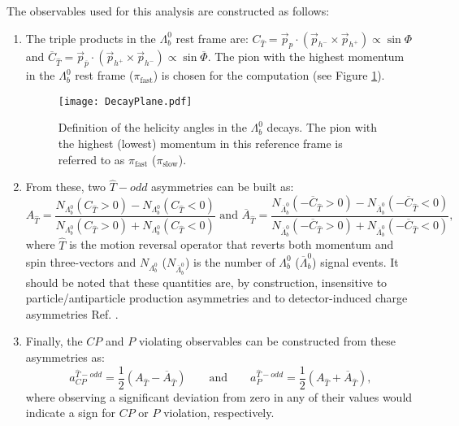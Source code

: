 \documentclass[12pt]{article}
\def\Pb      {\ensuremath{b}\xspace}
\def\PLambda      {\ensuremath{\Lambda}\xspace}
\def\Lz          {{\ensuremath{\PLambda}}\xspace}
\def\bquark    {{\ensuremath{\Pb}}\xspace}
\def\Lb      {{\ensuremath{\Lz^0_\bquark}}\xspace}
\def\CP                {{\ensuremath{C\!P}}\xspace}
\def\P                 {{\ensuremath{\!P}}\xspace}
\begin{document}
The observables used for this analysis are constructed as follows:
\begin{enumerate}
\item The triple products in the \Lb rest frame are: $C_{\hat{T}} = \vec{p}_p \cdot (\vec{p}_{h^-} \times \vec{p}_{h^+})\propto \sin \Phi$ and $\overline{C}_{\hat{T}} = \vec{p}_{\overline{p}} \cdot (\vec{p}_{h^+} \times \vec{p}_{h^-})\propto \sin \overline{\Phi}$. The pion with the highest momentum in the \Lb rest frame ($\pi_{\text{fast}}$) is chosen for the computation (see Figure \ref{fig:anglesLb}).

\begin{figure}[htb]
\begin{center}
\texttt{[image: DecayPlane.pdf]}
\caption{Definition of the helicity angles in the \Lb decays. The pion with the highest (lowest) momentum in this reference frame is referred to as $\pi_{\text{fast}}$ ($\pi_{\text{slow}}$).}
\label{fig:anglesLb}
\end{center}
\end{figure}

\item From these, two $\hat{T}-odd$ asymmetries can be built as: 
\begin{equation*}
A_{\hat{T}} = \frac{N_{\Lambda_b^0}(C_{\hat{T}}>0) - N_{\Lambda_b^0}(C_{\hat{T}}<0)}{N_{\Lambda_b^0}(C_{\hat{T}}>0) + N_{\Lambda_b^0}(C_{\hat{T}}<0)}  
  \text{ and } 
\overline{A}_{\hat{T}} = \frac{N_{\overline{\Lambda}_b^0}(-\overline{C}_{\hat{T}}>0) - N_{\overline{\Lambda}_b^0}(-\overline{C}_{\hat{T}}<0)}{N_{\overline{\Lambda}_b^0}(-\overline{C}_{\hat{T}}>0) + N_{\overline{\Lambda}_b^0}(-\overline{C}_{\hat{T}}<0)},
\end{equation*}
where $\hat{T}$ is the motion reversal operator that reverts both momentum and spin three-vectors and $N_{\Lambda_b^0}$ ($N_{\overline{\Lambda}_b^0}$) is the number of $\Lambda_b^0$ ($\overline{\Lambda}_b^0$) signal events. It should be noted that these quantities are, by construction, insensitive to particle/antiparticle production asymmetries and to detector-induced charge asymmetries Ref. \cite{observables}.
\item Finally, the \CP and \P violating observables can be constructed from these asymmetries as:
\begin{equation*}
a^{\hat{T}-odd}_{CP} = \frac{1}{2}(A_{\hat{T}} - \overline{A}_{\hat{T}})
 \qquad \text{and}  \qquad
a^{\hat{T}-odd}_{P} = \frac{1}{2}(A_{\hat{T}} + \overline{A}_{\hat{T}}),
\end{equation*}
where observing a significant deviation from zero in any of their values would indicate a sign for \CP or \P violation, respectively.
\end{enumerate}
\end{document}
